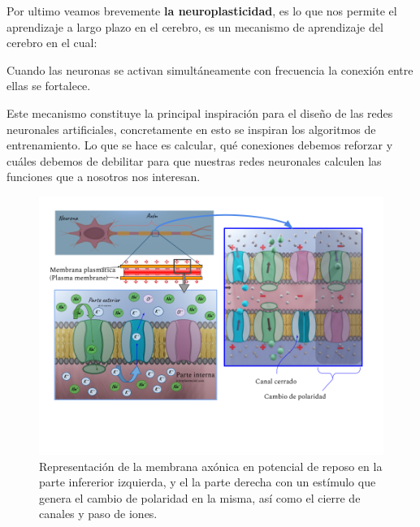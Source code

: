 Por ultimo veamos brevemente \textbf{la neuroplasticidad}, es lo que nos permite el aprendizaje a largo plazo en el cerebro, es un mecanismo de aprendizaje del cerebro en el cual:

Cuando las neuronas se activan simultáneamente con frecuencia la conexión entre ellas se fortalece.

Este mecanismo constituye la principal inspiración para el diseño de las redes neuronales artificiales, concretamente en esto se inspiran los algoritmos de entrenamiento. Lo que se hace es calcular, qué conexiones debemos reforzar y cuáles debemos de debilitar para que nuestras redes neuronales calculen las funciones que a nosotros nos interesan.

\begin{figure}[h]
 \centering
 \includegraphics[scale=0.5]{../Figuras/MembranaP.png}
 \caption{Representación de la membrana axónica en potencial de reposo en la parte infererior izquierda, y el la parte derecha con un estímulo que genera el cambio de polaridad en la misma, así como el cierre de canales y paso de iones.}
 \label{fig:MembranaP}
\end{figure}



